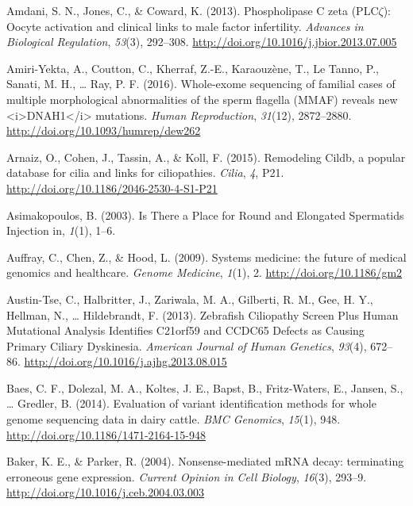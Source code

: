 \documentclass[12pt,twoside]{reedthesis}
\theoremstyle{definition}
\theoremstyle{definition}
\theoremstyle{remark}
\begin{document}
  \hypertarget{ref-Amdani2013}{}
  Amdani, S. N., Jones, C., \& Coward, K. (2013). Phospholipase C zeta
  (PLC\(\zeta\)): Oocyte activation and clinical links to male factor
  infertility. \emph{Advances in Biological Regulation}, \emph{53}(3),
  292--308. \url{http://doi.org/10.1016/j.jbior.2013.07.005}
  
  \hypertarget{ref-Amiri-Yekta2016}{}
  Amiri-Yekta, A., Coutton, C., Kherraf, Z.-E., Karaouzène, T., Le Tanno,
  P., Sanati, M. H., \ldots{} Ray, P. F. (2016). Whole-exome sequencing of
  familial cases of multiple morphological abnormalities of the sperm
  flagella (MMAF) reveals new
  \textless{}i\textgreater{}DNAH1\textless{}/i\textgreater{} mutations.
  \emph{Human Reproduction}, \emph{31}(12), 2872--2880.
  \url{http://doi.org/10.1093/humrep/dew262}
  
  \hypertarget{ref-Arnaiz2015}{}
  Arnaiz, O., Cohen, J., Tassin, A., \& Koll, F. (2015). Remodeling Cildb,
  a popular database for cilia and links for ciliopathies. \emph{Cilia},
  \emph{4}, P21. \url{http://doi.org/10.1186/2046-2530-4-S1-P21}
  
  \hypertarget{ref-Asimakopoulos2003}{}
  Asimakopoulos, B. (2003). Is There a Place for Round and Elongated
  Spermatids Injection in, \emph{1}(1), 1--6.
  
  \hypertarget{ref-Auffray2009}{}
  Auffray, C., Chen, Z., \& Hood, L. (2009). Systems medicine: the future
  of medical genomics and healthcare. \emph{Genome Medicine}, \emph{1}(1),
  2. \url{http://doi.org/10.1186/gm2}
  
  \hypertarget{ref-Austin-Tse2013}{}
  Austin-Tse, C., Halbritter, J., Zariwala, M. A., Gilberti, R. M., Gee,
  H. Y., Hellman, N., \ldots{} Hildebrandt, F. (2013). Zebrafish
  Ciliopathy Screen Plus Human Mutational Analysis Identifies C21orf59 and
  CCDC65 Defects as Causing Primary Ciliary Dyskinesia. \emph{American
  Journal of Human Genetics}, \emph{93}(4), 672--86.
  \url{http://doi.org/10.1016/j.ajhg.2013.08.015}
  
  \hypertarget{ref-Baes2014}{}
  Baes, C. F., Dolezal, M. A., Koltes, J. E., Bapst, B., Fritz-Waters, E.,
  Jansen, S., \ldots{} Gredler, B. (2014). Evaluation of variant
  identification methods for whole genome sequencing data in dairy cattle.
  \emph{BMC Genomics}, \emph{15}(1), 948.
  \url{http://doi.org/10.1186/1471-2164-15-948}
  
  \hypertarget{ref-Baker2004}{}
  Baker, K. E., \& Parker, R. (2004). Nonsense-mediated mRNA decay:
  terminating erroneous gene expression. \emph{Current Opinion in Cell
  Biology}, \emph{16}(3), 293--9.
  \url{http://doi.org/10.1016/j.ceb.2004.03.003}
  
\end{document}
